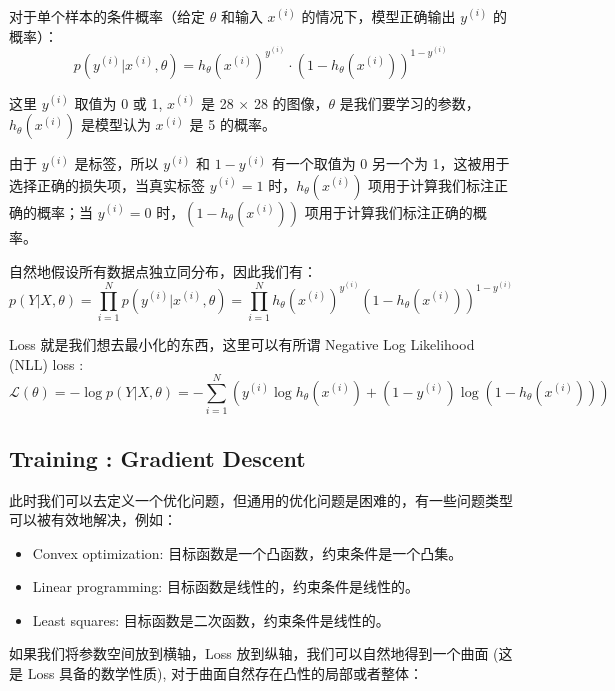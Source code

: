 对于单个样本的条件概率（给定 $\theta$ 和输入 $x^{(i)}$ 的情况下，模型正确输出 $y^{(i)}$ 的概率）：  
$$
p(y^{(i)} | x^{(i)}, \theta) = h_\theta(x^{(i)})^{y^{(i)}} \cdot \left(1 - h_\theta(x^{(i)})\right)^{1 - y^{(i)}}
$$


\begin{note}
    这里 $y^{(i)}$ 取值为 0 或 1, $x^{(i)}$ 是 28 $\times$ 28 的图像，$\theta$ 是我们要学习的参数，$h_\theta(x^{(i)})$ 是模型认为 $x^{(i)}$ 是 5 的概率。

    由于 $y^{(i)}$ 是标签，所以 $y^{(i)}$ 和 $1-y^{(i)}$ 有一个取值为 0 另一个为 1，这被用于选择正确的损失项，当真实标签 $y^{(i)}=1$ 时，$h_\theta(x^{(i)})$ 项用于计算我们标注正确的概率；当 $y^{(i)}=0$ 时，$(1 - h_\theta(x^{(i)}))$ 项用于计算我们标注正确的概率。
\end{note}
自然地假设所有数据点独立同分布，因此我们有：
$$ p(Y|X, \theta) = \prod_{i=1}^N p(y^{(i)}|x^{(i)}, \theta) = \prod_{i=1}^N h_{\theta}(x^{(i)})^{y^{(i)}} (1 - h_{\theta}(x^{(i)}))^{1-y^{(i)}} $$

Loss 就是我们想去最小化的东西，这里可以有所谓 Negative Log Likelihood (NLL) loss :
$$ \mathcal{L}({\theta}) = -\log p(Y|X, \theta) = -\sum_{i=1}^N \left( y^{(i)} \log h_{\theta}(x^{(i)}) + (1 - y^{(i)}) \log (1 - h_{\theta}(x^{(i)})) \right) $$

\subsection{Training : Gradient Descent}
此时我们可以去定义一个优化问题，但通用的优化问题是困难的，有一些问题类型可以被有效地解决，例如：
\begin{itemize}
    \item Convex optimization: 目标函数是一个凸函数，约束条件是一个凸集。
    \item Linear programming: 目标函数是线性的，约束条件是线性的。
    \item Least squares: 目标函数是二次函数，约束条件是线性的。
\end{itemize}
如果我们将参数空间放到横轴，Loss 放到纵轴，我们可以自然地得到一个曲面 (这是 Loss 具备的数学性质), 对于曲面自然存在凸性的局部或者整体：


